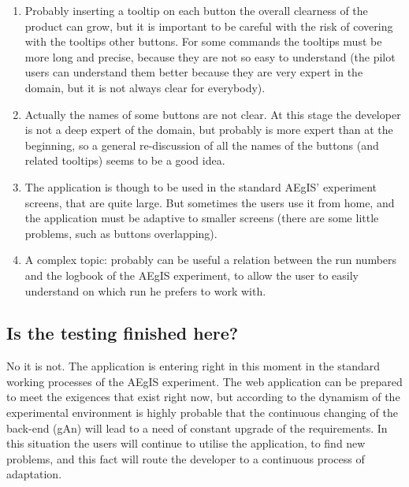 \begin{enumerate}

\item 
Probably inserting a tooltip on each button the overall clearness of the product can grow, but it is important to be careful with the risk of covering with the tooltips other buttons. For some commands the tooltips must be more long and precise, because they are not so easy to understand (the pilot users can understand them better because they are very expert in the domain, but it is not always clear for everybody).  

\item
Actually the names of some buttons are not clear. At this stage the developer is not a deep expert of the domain, but probably is more expert than at the beginning, so a general re-discussion of all the names of the buttons (and related tooltips) seems to be a good idea.

\item 
The application is though to be used in the standard AEgIS' experiment screens, that are quite large. But sometimes the users use it from home, and the application must be adaptive to smaller screens (there are some little problems, such as buttons overlapping).

\item
A complex topic: probably can be useful a relation between the run numbers and the logbook of the AEgIS experiment, to allow the user to easily understand on which run he prefers to work with.

\end{enumerate}

\subsection{Is the testing finished here?}

No it is not. The application is entering right in this moment in the standard working processes of the AEgIS experiment. The web application can be prepared to meet the exigences that exist right now, but according to the dynamism of the experimental environment is highly probable that the continuous changing of the back-end (gAn) will lead to a need of constant upgrade of the requirements. In this situation the users will continue to utilise the application, to find new problems, and this fact will route the developer to a continuous process of adaptation.   
